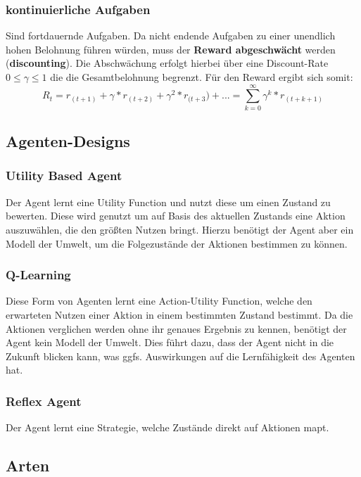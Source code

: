 \documentclass[10pt]{scrartcl}
\begin{document}
\subsubsection{kontinuierliche Aufgaben}
Sind fortdauernde Aufgaben. Da nicht endende Aufgaben zu einer unendlich hohen Belohnung führen würden, muss der \textbf{Reward abgeschwächt} werden (\textbf{discounting}). Die Abschwächung erfolgt hierbei über eine Discount-Rate $0 \leq \gamma  \leq 1$ die die Gesamtbelohnung begrenzt. Für den Reward ergibt sich somit: 
\begin{equation}
R_{t}= r_{(t+1)}+ \gamma*r_{(t+2)}+ \gamma^2*r_{(t+3})+ ... = \sum_{k=0}^\infty \gamma^{k}* r_{(t+k+1)}
\end{equation}

\subsection{Agenten-Designs}
\subsubsection{Utility Based Agent}
Der Agent lernt eine \glqq Utility Function\grqq\xspace und nutzt diese um einen Zustand zu bewerten. Diese wird genutzt um auf Basis des aktuellen Zustands eine Aktion auszuwählen, die den größten Nutzen bringt. Hierzu benötigt der Agent aber ein Modell der Umwelt, um die Folgezustände der Aktionen bestimmen zu können.

\subsubsection{Q-Learning}
Diese Form von Agenten lernt eine \glqq Action-Utility Function\grqq\xspace, welche den erwarteten Nutzen einer Aktion in einem bestimmten Zustand bestimmt. Da die Aktionen verglichen werden ohne ihr genaues Ergebnis zu kennen, benötigt der Agent kein Modell der Umwelt. Dies führt dazu, dass der Agent nicht in die Zukunft blicken kann, was ggfs. Auswirkungen auf die Lernfähigkeit des Agenten hat.

\subsubsection{Reflex Agent}
Der Agent lernt eine Strategie, welche Zustände direkt auf Aktionen mapt.

\subsection{Arten}
\end{document}
